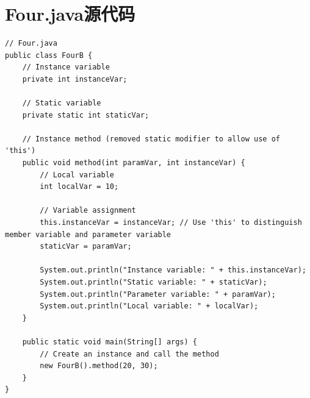 \documentclass[12pt,a4paper]{article}
\begin{document}
\section*{Four.java源代码}\label{sec:four}
\begin{lstlisting}
// Four.java
public class FourB {
    // Instance variable
    private int instanceVar;

    // Static variable
    private static int staticVar;

    // Instance method (removed static modifier to allow use of 'this')
    public void method(int paramVar, int instanceVar) {
        // Local variable
        int localVar = 10;

        // Variable assignment
        this.instanceVar = instanceVar; // Use 'this' to distinguish member variable and parameter variable
        staticVar = paramVar;

        System.out.println("Instance variable: " + this.instanceVar);
        System.out.println("Static variable: " + staticVar);
        System.out.println("Parameter variable: " + paramVar);
        System.out.println("Local variable: " + localVar);
    }

    public static void main(String[] args) {
        // Create an instance and call the method
        new FourB().method(20, 30);
    }
}

\end{lstlisting}
\end{document}
